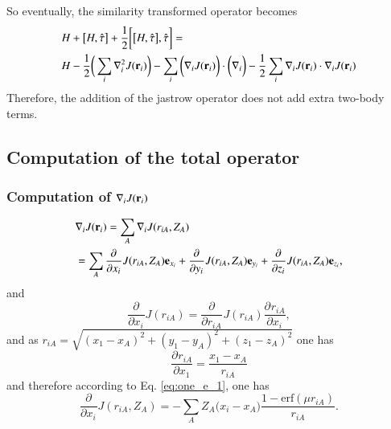 \documentclass[aip,jcp,reprint,noshowkeys,superscriptaddress]{revtex4-1}
\newcommand{\deriv}[3]{\frac{\partial^{#3} #1}{\partial {#2}^{#3}}}
\newcommand{\br}[0]{{\bf {r}}}
\begin{document}
So eventually, the similarity transformed operator becomes 
\begin{equation}
 \begin{aligned}
& H + \big[ H,\hat{\tau} \big] + \frac{1}{2} \bigg[ \big[H,\hat{\tau}\big],\hat{\tau}\bigg] = \\ & H -\frac{1}{2} \bigg( \sum_i \nabla^2_i J(\br{}_i) \bigg)    
                                                                   -\sum_i \bigg(\nabla_i J(\br{}_i) \bigg) \cdot \bigg( \nabla_i  \bigg)  
                                                                   -\frac{1}{2}\sum_i \nabla_i J({\bf r}_i) \cdot \nabla_i J({\bf r}_i) 
 \end{aligned}
\end{equation}
Therefore, the addition of the jastrow operator does not add extra two-body terms. 
\subsection{Computation of the total operator}
\subsubsection{Computation of $\nabla_i J(\br{}_i)$}
\begin{equation}
 \begin{aligned}
&\nabla_i J(\br{}_i) = \sum_A \nabla_i J(r_{iA},Z_A) \\
                    &= \sum_A \deriv{}{x_i}{} J(r_{iA},Z_A) {\bf e}_{x_i} + \deriv{}{y_i}{} J(r_{iA},Z_A) {\bf e}_{y_i} + \deriv{}{z_i}{} J(r_{iA},Z_A) {\bf e}_{z_i}, 
 \end{aligned}
\end{equation}
and 
\begin{equation}
 \deriv{}{x_i}{}J(r_{iA}) = \deriv{}{r_{iA}}{}J(r_{iA}) \deriv{r_{iA}}{x_i}{},
\end{equation}
and as $r_{iA} = \sqrt{(x_1 - x_A)^2 + (y_1 - y_A)^2 + (z_1 - z_A)^2} $ 
one has                                                              
\begin{equation}
 \deriv{r_{iA}}{x_1}{} = \frac{x_1 - x_A}{r_{iA}}
\end{equation}
and therefore according to Eq. \eqref{eq:one_e_1}, one has 
\begin{equation}
 \deriv{}{x_i}{} J(r_{iA},Z_A) = -\sum_A Z_A \big( x_i - x_A \big) \frac{1 - \text{erf}(\mu r_{iA})}{r_{iA}}.
\end{equation}
\end{document}

